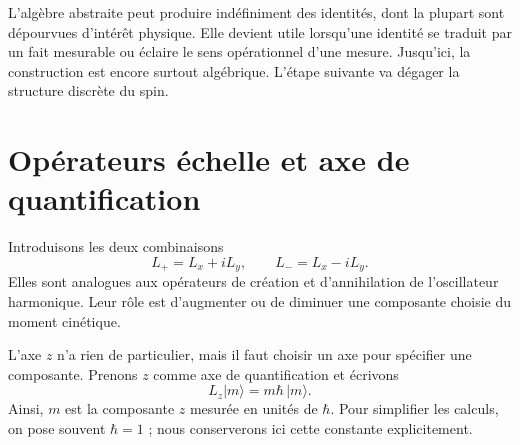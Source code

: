 \begin{classroomqa}
\end{classroomqa}

L’algèbre abstraite peut produire indéfiniment des identités, dont la plupart sont dépourvues d’intérêt physique. Elle devient utile lorsqu’une identité se traduit par un fait mesurable ou éclaire le sens opérationnel d’une mesure. Jusqu’ici, la construction est encore surtout algébrique. L’étape suivante va dégager la structure discrète du spin.

\begin{classroomqa}
\end{classroomqa}

\section{Opérateurs échelle et axe de quantification}

Introduisons les deux combinaisons
\begin{equation}
L_+=L_x+iL_y,
\qquad
L_-=L_x-iL_y.
\end{equation}
Elles sont analogues aux opérateurs de création et d’annihilation de l’oscillateur harmonique. Leur rôle est d’augmenter ou de diminuer une composante choisie du moment cinétique.

L’axe \(z\) n’a rien de particulier, mais il faut choisir un axe pour spécifier une composante. Prenons \(z\) comme axe de quantification et écrivons
\begin{equation}
L_z\lvert m\rangle=m\hbar\,\lvert m\rangle.
\end{equation}
Ainsi, \(m\) est la composante \(z\) mesurée en unités de \(\hbar\). Pour simplifier les calculs, on pose souvent \(\hbar=1\) ; nous conserverons ici cette constante explicitement.

